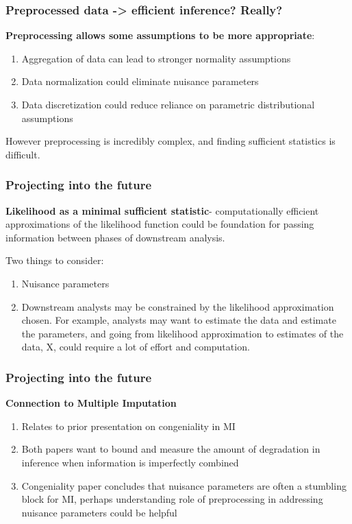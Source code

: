 \documentclass[10pt, compress]{beamer}
\begin{document}
\begin{frame}[fragile]
    \frametitle{Preprocessed data -> efficient inference? Really?}

    
    \textbf{Preprocessing allows some assumptions to be more appropriate}:

    \begin{enumerate}
    \item Aggregation of data can lead to stronger normality assumptions
    \item Data normalization could eliminate nuisance parameters
    \item Data discretization could reduce reliance on parametric distributional assumptions
    \end{enumerate}
    
    However preprocessing is incredibly complex, and finding sufficient statistics is difficult. 

\end{frame}

\begin{frame}[fragile]
    \frametitle{Projecting into the future}
    
    \textbf{Likelihood as a minimal sufficient statistic}- computationally efficient approximations of the likelihood function could be foundation for passing information between phases of downstream analysis.  
    
    Two things to consider:
    \begin{enumerate}
    \item Nuisance parameters 
    \item Downstream analysts may be constrained by the likelihood approximation chosen. For example, analysts may want to estimate the data and estimate the parameters, and going from likelihood approximation to estimates of the data, X, could require a lot of effort and computation.
    \end{enumerate}

\end{frame}

\begin{frame}[fragile]
    \frametitle{Projecting into the future}
    
    \textbf{Connection to Multiple Imputation} 
    
    \begin{enumerate}
    \item Relates to prior presentation on congeniality in MI
    \item Both papers want to bound and measure the amount of degradation in inference when information is imperfectly combined
    \item Congeniality paper concludes that nuisance parameters are often a stumbling block for MI, perhaps understanding role of preprocessing in addressing nuisance parameters could be helpful
    \end{enumerate}
    
\end{frame}
\end{document}
